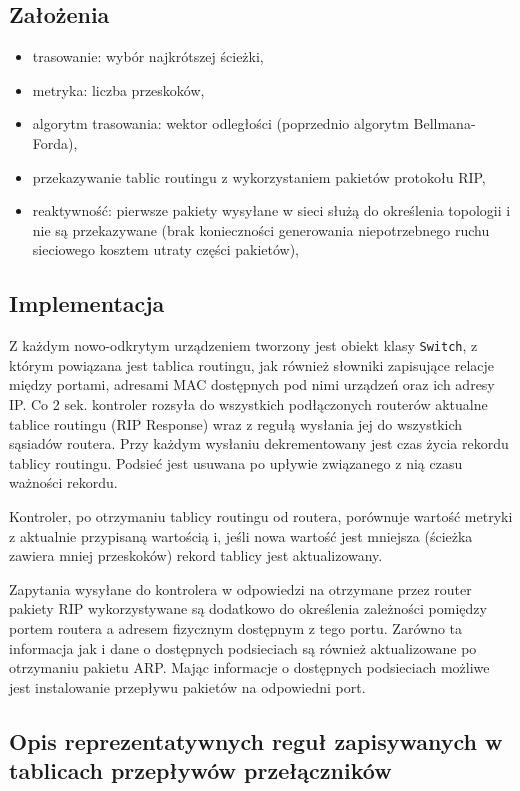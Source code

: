 \documentclass{article}
\begin{document}
	\subsection{Założenia}
	\begin{itemize}
		\item trasowanie: wybór najkrótszej ścieżki,
		\item metryka: liczba przeskoków,
		\item algorytm trasowania: wektor odległości (poprzednio algorytm Bellmana-Forda),
		\item przekazywanie tablic routingu z wykorzystaniem pakietów protokołu RIP,
		\item reaktywność: pierwsze pakiety wysyłane w sieci służą do określenia topologii i nie są przekazywane (brak konieczności generowania niepotrzebnego ruchu sieciowego kosztem utraty części pakietów),
	\end{itemize}
	
	\subsection{Implementacja}	
	Z każdym nowo-odkrytym urządzeniem tworzony jest obiekt klasy \texttt{Switch}, z którym powiązana jest tablica routingu, jak również słowniki zapisujące relacje między portami, adresami MAC dostępnych pod nimi urządzeń oraz ich adresy IP. Co 2 sek. kontroler rozsyła do wszystkich podłączonych routerów aktualne tablice routingu (RIP Response) wraz z regułą wysłania jej do wszystkich sąsiadów routera. Przy każdym wysłaniu dekrementowany jest czas życia rekordu tablicy routingu. Podsieć jest usuwana po upływie związanego z nią czasu ważności rekordu.
	
	Kontroler, po otrzymaniu tablicy routingu od routera, porównuje wartość metryki z aktualnie przypisaną wartością i, jeśli nowa wartość jest mniejsza (ścieżka zawiera mniej przeskoków) rekord tablicy jest aktualizowany.
	
	Zapytania wysyłane do kontrolera w odpowiedzi na otrzymane przez router pakiety RIP wykorzystywane są dodatkowo do określenia zależności pomiędzy portem routera a adresem fizycznym dostępnym z tego portu. Zarówno ta informacja jak i dane o dostępnych podsieciach są również aktualizowane po otrzymaniu pakietu ARP. Mając informacje o dostępnych podsieciach możliwe jest instalowanie przepływu pakietów na odpowiedni port.
	\subsection{Opis reprezentatywnych reguł zapisywanych w tablicach przepływów przełączników}
	
\end{document}
